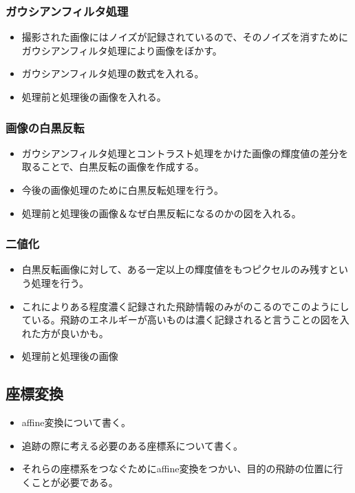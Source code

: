 \documentclass[12pt,a4paper]{jarticle}
\begin{document}
\subsubsection{ガウシアンフィルタ処理}
\begin{itemize}
    \item 撮影された画像にはノイズが記録されているので、そのノイズを消すためにガウシアンフィルタ処理により画像をぼかす。
    \item ガウシアンフィルタ処理の数式を入れる。
    \item 処理前と処理後の画像を入れる。
\end{itemize}
\subsubsection{画像の白黒反転}
\begin{itemize}
    \item ガウシアンフィルタ処理とコントラスト処理をかけた画像の輝度値の差分を取ることで、白黒反転の画像を作成する。
    \item 今後の画像処理のために白黒反転処理を行う。
    \item 処理前と処理後の画像＆なぜ白黒反転になるのかの図を入れる。
\end{itemize}
\subsubsection{二値化}
\begin{itemize}
    \item 白黒反転画像に対して、ある一定以上の輝度値をもつピクセルのみ残すという処理を行う。
    \item これによりある程度濃く記録された飛跡情報のみがのこるのでこのようにしている。飛跡のエネルギーが高いものは濃く記録されると言うことの図を入れた方が良いかも。
    \item 処理前と処理後の画像
\end{itemize}
\subsection{座標変換}
\begin{itemize}
    \item affine変換について書く。
    \item 追跡の際に考える必要のある座標系について書く。
    \item それらの座標系をつなぐためにaffine変換をつかい、目的の飛跡の位置に行くことが必要である。
\end{itemize}
\end{document}
